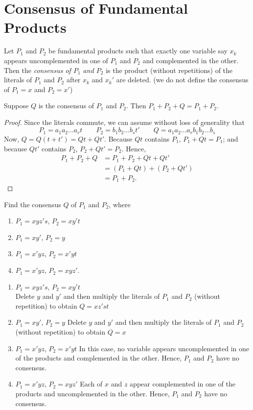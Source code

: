 \documentclass[../main-sheet.tex]{subfiles}
\begin{document}
\section{Consensus of Fundamental Products}
Let $ P_1 $ and $ P_2 $ be fundamental products such that exactly one variable say $ x_k $ appears uncomplemented in one of $ P_1 $ and $ P_2 $ and complemented in the other. Then the \emph{consensus of $ P_1 $ and $ P_2 $} is the product (without repetitions) of the literals of $ P_1 $ and $ P_2 $ after $ x_k $ and $ x_k' $ are deleted. (we do not define the consensus of $ P_1=x $ and $ P_2=x' $)
\begin{lem}
    Suppose $ Q $ is the consensus of $ P_1 $ and $ P_2 $. Then $ P_1 + P_2 + Q = P_1 + P_2 $.
\end{lem}
\begin{proof}
    Since the literals commute, we can assume without loss of generality that
    \[
        P_1=a_1a_2\dots a_r t \qquad P_2=b_1b_2\dots b_s t' \qquad Q=a_1a_2\dots a_rb_1b_2\dots b_s
    \]
    Now, $ Q = Q(t+t') = Qt+Qt' $. Because $ Qt $ contains $ P_1 $, $ P_1+Qt = P_1 $; and because $ Qt' $ contains $ P_2 $, $ P_2+Qt' = P_2 $.
    Hence,
    \begin{align*}
        P_1+P_2+Q&=P_1+P_2+Qt+Qt'\\
        &=(P_1+Qt)+(P_2+Qt')\\
        &=P_1+P_2.
    \end{align*}
\end{proof}
\begin{prob}
    Find the consensus $ Q $ of $ P_1 $ and $ P_2 $, where
    \begin{enumerate}[label=(\roman*)]
        \item $ P_1=xyz's $, $ P_2=xy't $
        \item $ P_1=xy' $, $ P_2=y $
        \item $ P_1=x'yz $, $ P_2=x'yt $
        \item $ P_1=x'yz $, $ P_2=xyz' $.
    \end{enumerate}
\end{prob}
\begin{soln}
    \hfill
    \begin{enumerate}[label=(\roman*)]
        \item $ P_1=xyz's $, $ P_2=xy't $\\
        Delete $ y $ and $ y' $ and then multiply the literals of $ P_1 $ and $ P_2 $ (without repetition) to obtain $ Q = xz' st $
        \item $ P_1=xy' $, $ P_2=y $
        Delete $ y $ and $ y' $ and then multiply the literals of $ P_1 $ and $ P_2 $ (without repetition) to obtain $ Q = x$
        \item $ P_1=x'yz $, $ P_2=x'yt $
        In this case, no variable appears uncomplemented in one of the products and complemented in the other. Hence, $ P_1 $ and $ P_2 $ have no consensus.
        \item $ P_1=x'yz $, $ P_2=xyz' $
        Each of $ x $ and $ z $ appear complemented in one of the products and uncomplemented in the other. Hence, $ P_1 $ and $ P_2 $ have no consensus.
    \end{enumerate}
\end{soln}
\end{document}
